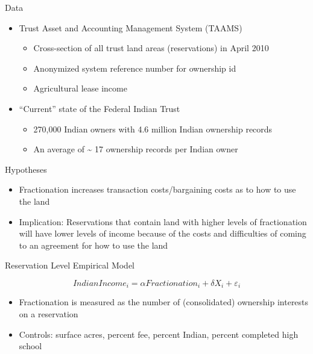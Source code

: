 \documentclass[ignorenonframetext,]{beamer}
\begin{document}
\begin{frame}{Data}

\begin{itemize}
\itemsep1pt\parskip0pt
\item
  Trust Asset and Accounting Management System (TAAMS)

  \begin{itemize}
  \itemsep1pt\parskip0pt
  \item
    Cross-section of all trust land areas (reservations) in April 2010
  \item
    Anonymized system reference number for ownership id
  \item
    Agricultural lease income
  \end{itemize}
\item
  ``Current'' state of the Federal Indian Trust

  \begin{itemize}
  \itemsep1pt\parskip0pt
  \item
    270,000 Indian owners with 4.6 million Indian ownership records\\
  \item
    An average of \textasciitilde{} 17 ownership records per Indian
    owner
  \end{itemize}
\end{itemize}

\end{frame}

\begin{frame}{Hypotheses}

\begin{itemize}
\item
  Fractionation increases transaction costs/bargaining costs as to how
  to use the land
\item
  Implication: Reservations that contain land with higher levels of
  fractionation will have lower levels of income because of the costs
  and difficulties of coming to an agreement for how to use the land
\end{itemize}

\end{frame}

\begin{frame}{Reservation Level Empirical Model}

\[ IndianIncome_{i} = \alpha Fractionation_{i} + \delta X_{i} + \varepsilon _{i}\]

\begin{itemize}
\itemsep1pt\parskip0pt
\item
  Fractionation is measured as the number of (consolidated) ownership
  interests on a reservation
\item
  Controls: surface acres, percent fee, percent Indian, percent
  completed high school
\end{itemize}

\end{frame}
\end{document}
